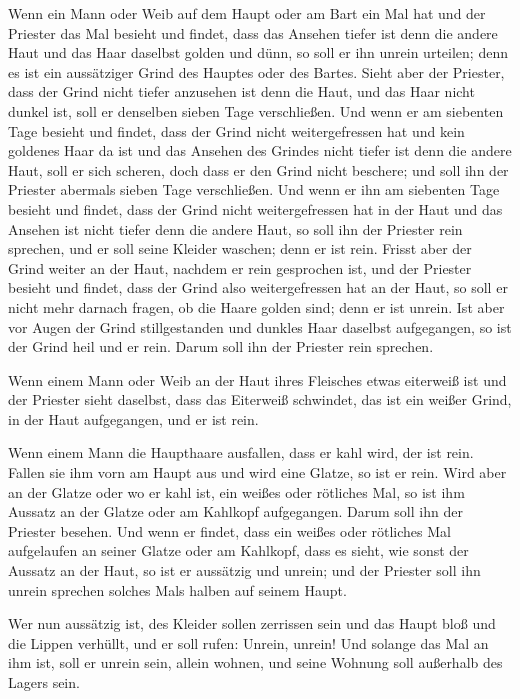  Wenn ein Mann oder Weib auf dem Haupt oder am Bart ein
Mal hat  und der Priester das Mal besieht und findet,
dass das Ansehen tiefer ist denn die andere Haut und das Haar daselbst
golden und dünn, so soll er ihn unrein urteilen; denn es ist ein
aussätziger Grind des Hauptes oder des Bartes.  Sieht
aber der Priester, dass der Grind nicht tiefer anzusehen ist denn die
Haut, und das Haar nicht dunkel ist, soll er denselben sieben Tage
verschließen.  Und wenn er am siebenten Tage besieht und
findet, dass der Grind nicht weitergefressen hat und kein goldenes Haar
da ist und das Ansehen des Grindes nicht tiefer ist denn die andere
Haut,  soll er sich scheren, doch dass er den Grind nicht
beschere; und soll ihn der Priester abermals sieben Tage verschließen.
 Und wenn er ihn am siebenten Tage besieht und findet,
dass der Grind nicht weitergefressen hat in der Haut und das Ansehen ist
nicht tiefer denn die andere Haut, so soll ihn der Priester rein
sprechen, und er soll seine Kleider waschen; denn er ist rein.
 Frisst aber der Grind weiter an der Haut, nachdem er
rein gesprochen ist,  und der Priester besieht und
findet, dass der Grind also weitergefressen hat an der Haut, so soll er
nicht mehr darnach fragen, ob die Haare golden sind; denn er ist unrein.
 Ist aber vor Augen der Grind stillgestanden und dunkles
Haar daselbst aufgegangen, so ist der Grind heil und er rein. Darum soll
ihn der Priester rein sprechen.

 Wenn einem Mann oder Weib an der Haut ihres Fleisches
etwas eiterweiß ist  und der Priester sieht daselbst,
dass das Eiterweiß schwindet, das ist ein weißer Grind, in der Haut
aufgegangen, und er ist rein.

 Wenn einem Mann die Haupthaare ausfallen, dass er kahl
wird, der ist rein.  Fallen sie ihm vorn am Haupt aus und
wird eine Glatze, so ist er rein.  Wird aber an der
Glatze oder wo er kahl ist, ein weißes oder rötliches Mal, so ist ihm
Aussatz an der Glatze oder am Kahlkopf aufgegangen. 
Darum soll ihn der Priester besehen. Und wenn er findet, dass ein weißes
oder rötliches Mal aufgelaufen an seiner Glatze oder am Kahlkopf, dass
es sieht, wie sonst der Aussatz an der Haut,  so ist er
aussätzig und unrein; und der Priester soll ihn unrein sprechen solches
Mals halben auf seinem Haupt.

 Wer nun aussätzig ist, des Kleider sollen zerrissen sein
und das Haupt bloß und die Lippen verhüllt, und er soll rufen: Unrein,
unrein!  Und solange das Mal an ihm ist, soll er unrein
sein, allein wohnen, und seine Wohnung soll außerhalb des Lagers sein.

